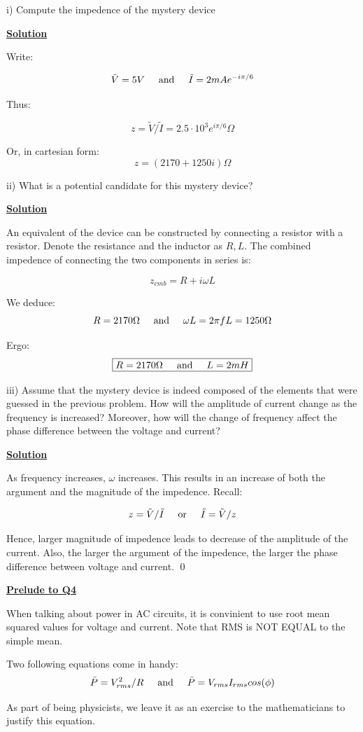 \documentclass{article}
\newcommand{\new}[1]{
    \vspace{2mm}
    \noindent
    \textbf{
    \underline{#1}}
}
\newcommand{\textOr}{
    {
        \hspace{5mm}
        \textrm{or}
        \hspace{5mm}
    }
}
\newcommand{\textAnd}{
    {
        \hspace{5mm}
        \textrm{and}
        \hspace{5mm}
    }
}
\def\Ohm{{\Omega}}
\begin{document}
i) Compute the impedence of the mystery device

\new{Solution}

Write:

\[
    \tilde{V} = 5V
    \textAnd
    \tilde{I} = 2mA e^{-i\pi/6}
\]

Thus:

\[
    z = \tilde{V}/\tilde{I} = 2.5\cdot10^3 e^{i\pi/6} \Ohm
\]

Or, in cartesian form:
\[
    \boxed{
        z = (2170+1250i)\Ohm
    }
\]

ii) What is a potential candidate for this mystery device?

\new{Solution}
An equivalent of the device can be constructed 
by connecting a resistor with a resistor. Denote the 
resistance and the inductor as $R, L$. The combined 
impedence of connecting the two components in series is:

\[
    z_{cmb} = R + i\omega L
\]

We deduce:
\[
    R = 2170\Ohm 
    \textAnd 
    \omega L  = 2\pi f L = 1250 \Ohm
\]

Ergo:
\[
    \boxed{
        R = 2170\Ohm 
        \textAnd
        L = 2mH
    }
\]

iii) Assume that the mystery device is indeed composed of 
the elements that were guessed in the previous problem. 
How will the amplitude of current change as the frequency 
is increased? Moreover, how will the change of frequency 
affect the phase difference between the voltage and current?

\new{Solution}
As frequency increases, $\omega$ increases. This results 
in an increase of both the argument and the magnitude of 
the impedence. Recall:

\[
    z = \tilde{V}/\tilde{I}
    \textOr 
    \tilde{I} = \tilde{V}/z
\]

Hence, larger magnitude of impedence leads to decrease of 
the amplitude of the current. Also, the larger the argument 
of the impedence, the larger the phase difference between 
voltage and current. 
\qed

\new{Prelude to Q4}
When talking about power in AC circuits, it is convinient 
to use root mean squared values for voltage and current. Note that 
RMS is NOT EQUAL to the simple mean. 

Two following equations come in handy:
\[
    \bar{P} = V_{rms}^2/R
    \textAnd
    \bar{P} = V_{rms}I_{rms}cos(\phi)
\]

As part of being physicists, we leave it as an exercise to 
the mathematicians to justify this equation. 
\end{document}
